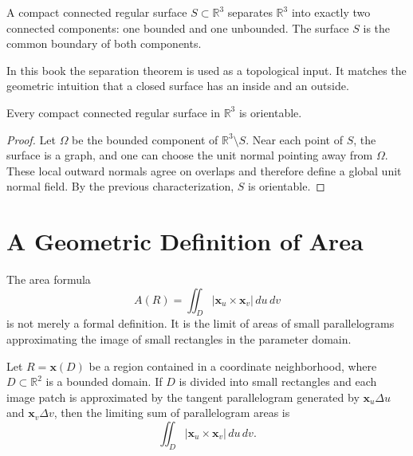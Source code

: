 \documentclass[12pt, oneside]{book}
\begin{document}
\begin{theorem}
    A compact connected regular surface
    $S\subset \mathbb{R}^3$ separates $\mathbb{R}^3$ into exactly two
    connected components: one bounded and one unbounded.  The surface $S$ is
    the common boundary of both components.
\end{theorem}

\begin{remark}
    In this book the separation theorem is used as a topological input.  It
    matches the geometric intuition that a closed surface has an inside and an
    outside.
\end{remark}

\begin{theorem}
    Every compact connected regular surface in $\mathbb{R}^3$ is orientable.
\end{theorem}

\begin{proof}
    Let $\Omega$ be the bounded component of
    $\mathbb{R}^3\setminus S$.  Near each point of $S$, the surface is a graph,
    and one can choose the unit normal pointing away from $\Omega$.  These
    local outward normals agree on overlaps and therefore define a global unit
    normal field.  By the previous characterization, $S$ is orientable.
\end{proof}

\section{A Geometric Definition of Area}

\begin{remark}
    The area formula
    \[
        A(R)=\iint_D|\mathbf{x}_u\times \mathbf{x}_v|\,du\,dv
    \]
    is not merely a formal definition.  It is the limit of areas of small
    parallelograms approximating the image of small rectangles in the parameter
    domain.
\end{remark}

\begin{proposition}
    Let $R=\mathbf{x}(D)$ be a region contained in a coordinate neighborhood,
    where $D\subset \mathbb{R}^2$ is a bounded domain.  If $D$ is divided into
    small rectangles and each image patch is approximated by the tangent
    parallelogram generated by $\mathbf{x}_u\Delta u$ and
    $\mathbf{x}_v\Delta v$, then the limiting sum of parallelogram areas is
    \[
        \iint_D|\mathbf{x}_u\times \mathbf{x}_v|\,du\,dv.
    \]
\end{proposition}
\end{document}
